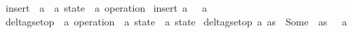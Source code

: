 \begin{isabellebody}
\isamarkupfalse%
\ insert\ {\isacharcolon}{\isacharcolon}\ {\isachardoublequoteopen}{\isacharprime}a\ {\isasymRightarrow}\ {\isacharparenleft}{\isacharprime}a\ state{\isacharparenright}\ {\isasymRightarrow}\ {\isacharparenleft}{\isacharprime}a\ operation{\isacharparenright}{\isachardoublequoteclose}\ \isanewline
{\isachardoublequoteopen}insert\ a\ {\isacharunderscore}\ {\isacharequal}\ a\ {\isachardoublequoteclose}\isanewline
\isanewline
{}\isamarkupfalse%
\ delta{\isacharunderscore}gset{\isacharunderscore}op\ {\isacharcolon}{\isacharcolon}\ {\isachardoublequoteopen}{\isacharparenleft}{\isacharprime}a\ operation{\isacharparenright}\ {\isasymRightarrow}\ {\isacharparenleft}{\isacharprime}a\ state{\isacharparenright}\ {\isasymrightharpoonup}\ {\isacharparenleft}{\isacharprime}a\ state{\isacharparenright}{\isachardoublequoteclose}\ \isanewline
{\isachardoublequoteopen}delta{\isacharunderscore}gset{\isacharunderscore}op\ a\ as\ {\isacharequal}\ Some\ {\isacharparenleft}\ as\ {\isasymunion}\ {\isacharbraceleft}\ a\ {\isacharbraceright}{\isacharparenright}{\isachardoublequoteclose}
\end{isabellebody}
